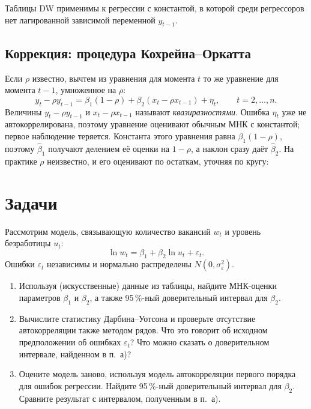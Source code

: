 \dwzonesvisual

Таблицы DW применимы к регрессии с константой, в которой среди регрессоров
нет лагированной зависимой переменной $y_{t-1}$.

\subsection{Коррекция: процедура Кохрейна--Оркатта}

Если $\rho$ известно, вычтем из уравнения для момента $t$ то же уравнение
для момента $t-1$, умноженное на $\rho$:
\begin{equation}
  y_t - \rho y_{t-1} = \beta_1(1 - \rho) + \beta_2(x_t - \rho x_{t-1}) + \eta_t,
  \qquad t = 2, \dots, n .
  \label{eq:co}
\end{equation}
Величины $y_t - \rho y_{t-1}$ и $x_t - \rho x_{t-1}$ называют
\emph{квазиразностями}. Ошибка $\eta_t$ уже не автокоррелирована, поэтому
уравнение оценивают обычным МНК с константой; первое наблюдение теряется.
Константа этого уравнения равна $\beta_1(1 - \rho)$, поэтому
$\widehat\beta_1$ получают делением её оценки на $1 - \rho$, а наклон сразу
даёт $\widehat\beta_2$. На практике $\rho$ неизвестно, и его оценивают по
остаткам, уточняя по кругу:

\coloopvisual
\fi

\ifsolutions\clearpage\fi
\section{Задачи}


Рассмотрим модель, связывающую количество вакансий $w_t$ и уровень
безработицы $u_t$:
\[
  \ln w_t = \beta_1 + \beta_2\ln u_t + \varepsilon_t .
\]
Ошибки $\varepsilon_t$ независимы и нормально распределены
$N(0, \sigma_{\varepsilon}^2)$.
\begin{enumerate}[label=\asbuk*), leftmargin=2.2em, itemsep=3pt]
  \item Используя (искусственные) данные из таблицы, найдите МНК-оценки
        параметров $\beta_1$ и $\beta_2$, а также 95\,\%-ный доверительный
        интервал для $\beta_2$.
  \item Вычислите статистику Дарбина--Уотсона и проверьте отсутствие
        автокорреляции также методом рядов. Что это говорит об
        исходном предположении об ошибках $\varepsilon_t$? Что можно сказать
        о доверительном интервале, найденном в п.~а)?
  \item Оцените модель заново, используя модель автокорреляции первого
        порядка для ошибок регрессии. Найдите 95\,\%-ный доверительный
        интервал для $\beta_2$. Сравните результат с интервалом, полученным в
        п.~а).
\end{enumerate}

